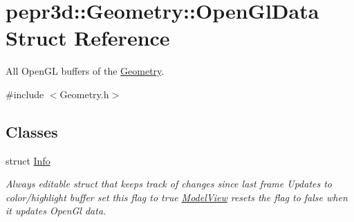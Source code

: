\hypertarget{structpepr3d_1_1_geometry_1_1_open_gl_data}{}\section{pepr3d\+::Geometry\+::Open\+Gl\+Data Struct Reference}
\label{structpepr3d_1_1_geometry_1_1_open_gl_data}


All Open\+GL buffers of the \mbox{\hyperlink{classpepr3d_1_1_geometry}{Geometry}}.  




{\ttfamily \#include $<$Geometry.\+h$>$}

\subsection*{Classes}
\begin{DoxyCompactItemize}
\item 
struct \mbox{\hyperlink{structpepr3d_1_1_geometry_1_1_open_gl_data_1_1_info}{Info}}
\begin{DoxyCompactList}\small\item\em Always editable struct that keeps track of changes since last frame Updates to color/highlight buffer set this flag to true \mbox{\hyperlink{classpepr3d_1_1_model_view}{Model\+View}} resets the flag to false when it updates Open\+Gl data. \end{DoxyCompactList}\end{DoxyCompactItemize}
